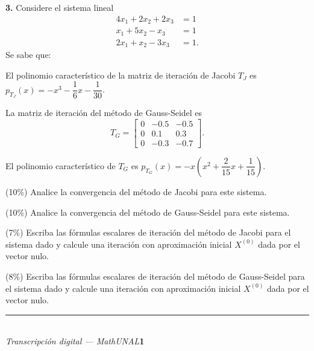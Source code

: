 \documentclass[11pt]{article}
\begin{document}
\vspace{5mm}
\noindent\textbf{3.} Considere el sistema lineal
\[
\begin{aligned}
4x_1+2x_2+2x_3&=1\\
x_1+5x_2-x_3&=1\\
2x_1+x_2-3x_3&=1.
\end{aligned}
\]
Se sabe que:
\begin{opciones}
\item[i.] El polinomio característico de la matriz de iteración de Jacobi $T_J$ es $p_{T_J}(x)=-x^3-\dfrac{1}{6}x-\dfrac{1}{30}$.
\item[ii.] La matriz de iteración del método de Gauss-Seidel es
\[
T_G=\begin{bmatrix} 0 & -0.5 & -0.5 \\ 0 & 0.1 & 0.3 \\ 0 & -0.3 & -0.7 \end{bmatrix}.
\]
\item[iii.] El polinomio característico de $T_G$ es $p_{T_G}(x)=-x\left(x^2+\dfrac{2}{15}x+\dfrac{1}{15}\right)$.
\end{opciones}
\begin{opciones}
\item (10\%) Analice la convergencia del método de Jacobi para este sistema.
\item (10\%) Analice la convergencia del método de Gauss-Seidel para este sistema.
\item (7\%) Escriba las fórmulas escalares de iteración del método de Jacobi para el sistema dado y calcule una iteración con aproximación inicial $X^{(0)}$ dada por el vector nulo.
\item (8\%) Escriba las fórmulas escalares de iteración del método de Gauss-Seidel para el sistema dado y calcule una iteración con aproximación inicial $X^{(0)}$ dada por el vector nulo.
\end{opciones}

\vfill
\rule{\linewidth}{0.4pt}\\[1pt]
{\scriptsize\textit{Transcripción digital --- MathUNAL}\hfill\textcolor{unalblue}{\textbf{1}}}
\end{document}
